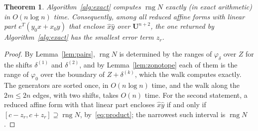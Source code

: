 \documentclass[10pt]{article}
\newtheorem{theorem}{Theorem}
\theoremstyle{definition}
\newcommand{\U}{\mathbf{U}}
\newcommand{\rng}{\operatorname{rng}}
\begin{document}
\begin{theorem}
\label{thm:exact}
Algorithm~\ref{alg:exact} computes $\rng N$ exactly (in exact arithmetic) in $O(n\log n)$ time. Consequently, among all reduced affine forms with linear part $e^T(y_0x+x_0y)$ that enclose $\hat x\hat y$ over $\U^{n+2}$, the one returned by Algorithm~\ref{alg:exact} has the smallest error term $z_r$.
\end{theorem}
\begin{proof}
By Lemma~\ref{lem:pairs}, $\rng N$ is determined by the ranges of $\varphi_\delta$ over $Z$ for the shifts $\delta^{(1)}$ and $\delta^{(2)}$, and by Lemma~\ref{lem:zonotope} each of them is the range of $\varphi_0$ over the boundary of $Z+\delta^{(k)}$, which the walk computes exactly. The generators are sorted once, in $O(n\log n)$ time, and the walk along the $2m\le 2n$ edges, with two shifts, takes $O(n)$ time. For the second statement, a reduced affine form with that linear part encloses $\hat x\hat y$ if and only if $[c-z_r,c+z_r]\supseteq\rng N$, by~\eqref{eq:product}; the narrowest such interval is $\rng N$.
\end{proof}
\end{document}
